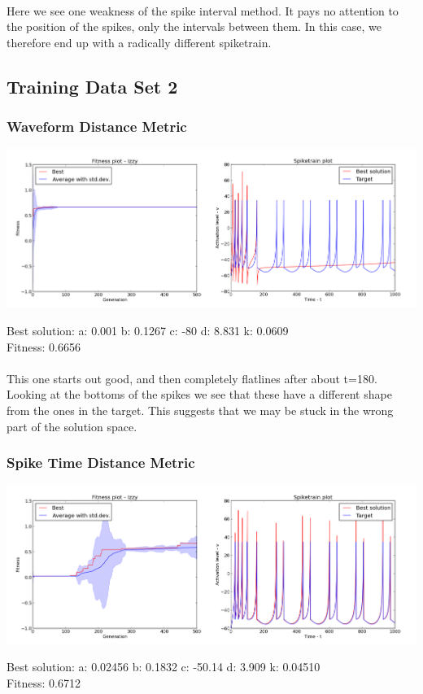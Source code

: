 \documentclass[a4paper,12pt]{article}
\begin{document}
\paragraph{}Here we see one weakness of the spike interval method. It pays no attention to the position of the spikes, only the intervals between them. In this case, we therefore end up with a radically different spiketrain.

\subsection{Training Data Set 2}
\subsubsection{Waveform Distance Metric}
\centerline{\includegraphics[width=1.2\textwidth]{img/case2_wave}}
Best solution: 
a: 0.001 
b: 0.1267 
c: -80 
d: 8.831 
k: 0.0609 \\
Fitness: 0.6656
\paragraph{}This one starts out good, and then completely flatlines after about t=180. Looking at the bottoms of the spikes we see that these have a different shape from the ones in the target. This suggests that we may be stuck in the wrong part of the solution space.

\subsubsection{Spike Time Distance Metric}
\centerline{\includegraphics[width=1.2\textwidth]{img/case2_time}}
Best solution: 
a: 0.02456 
b: 0.1832 
c: -50.14 
d: 3.909 
k: 0.04510 \\
Fitness: 0.6712
\end{document}
